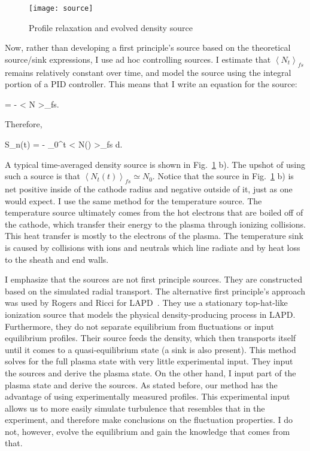 \begin{figure}[!ht]
\centerline{\texttt{[image: source]}}
\caption{Profile relaxation and evolved density source}
\label{source}
\end{figure}


Now, rather than developing a first principle's source based on the theoretical source/sink expressions, I use ad hoc controlling sources. 
I estimate that $\left< N_t \right>_{fs}$ remains relatively constant over time, and model the source using the integral
portion of a PID controller. This means that I write an equation for the source:

\beq
\label{Sn_eq}
 = - \left< N \right>_{fs}.
\eeq

Therefore,

\beq
\label{Sn_eq2}
S_n(t) = - \int_0^t \left< N(\tau) \right>_{fs} d\tau.
\eeq

A typical time-averaged density source is shown in Fig.~\ref{source} b).
The upshot of using such a source is that $\left< N_t(t) \right>_{fs} \simeq N_0$. Notice that the source in Fig.~\ref{source} b) is net positive inside of the cathode radius and negative
outside of it, just as one would expect.
I use the same method for the temperature source. The temperature source ultimately comes from the hot electrons that are boiled off of
the cathode, which transfer their energy to the plasma through ionizing collisions. This heat transfer is mostly to the electrons of the plasma. The temperature sink is caused by collisions
with ions and neutrals which line radiate and by heat loss to the sheath and end walls.

I emphasize that the sources are not first principle sources. They are constructed based on the simulated radial transport. The alternative first principle's approach was used by Rogers and Ricci
for LAPD~\cite{rogers2010}. They use a stationary top-hat-like ionization source that models the physical density-producing process in LAPD. 
Furthermore, they do not separate equilibrium from fluctuations or input equilibrium profiles. Their source feeds the density, which then transports itself until it comes to a quasi-equilibrium state
(a sink is also present). This method solves for the full plasma state with very little experimental input. 
They input the sources and derive the plasma state. On the other hand, I input part of the plasma
state and derive the sources. As stated before, our method has the advantage of using experimentally measured profiles. 
This experimental input allows us to more easily simulate turbulence that resembles that
in the experiment, and therefore make conclusions on the fluctuation properties. I do not, however, evolve the equilibrium and gain the knowledge that comes from that.

